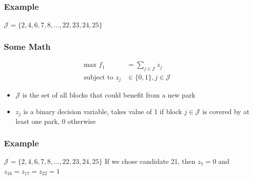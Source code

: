 \documentclass[10pt, compress]{beamer}
\begin{document}
\begin{frame}[fragile]
  \frametitle{Example}
  \begin{center}
\end{center}
$\mathcal{J} = \{2,4,6,7,8,\dots, 22,23,24,25\}$
\end{frame}

\begin{frame}[fragile]
\frametitle{Some Math}
\begin{align*}
\textrm{max } f_1 &= \sum_{j \in \mathcal{J}} z_j \\
\textrm{subject to } z_j &\in \{0,1\}, j \in \mathcal{J}
\end{align*}
\begin{itemize}
\item $\mathcal{J}$ is the set of all blocks that could benefit from a new park 
\item $z_j$ is a binary decision variable, takes value of 1 if block $j \in \mathcal{J}$ is covered by at least one park, 0 otherwise
\end{itemize}
\end{frame}

\begin{frame}[fragile]
  \frametitle{Example}
  \begin{center}
\end{center}
$\mathcal{J} = \{2,4,6,7,8,\dots, 22,23,24,25\}$ \newline
If we chose candidate 21, then $z_7 = 0$ and $z_{16} = z_{17} = z_{22} = 1$ 
\end{frame}
\end{document}

